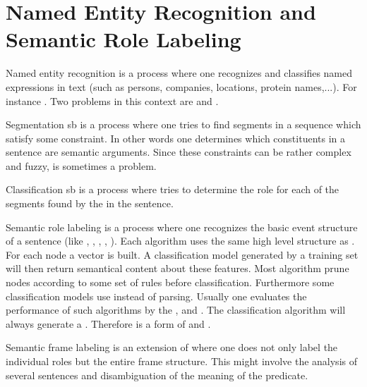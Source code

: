 \section{Named Entity Recognition and Semantic Role Labeling}
\begin{df}{Named entity recognition}
\sb{} is a process where one recognizes and classifies named expressions in text (such as persons, companies, locations, protein names,...). For instance . Two problems in this context are  and .
\end{df}
\begin{df}{Segmentation}
sb{} is a process where one tries to find segments in a sequence which satisfy some constraint. In other words one determines which constituents in a sentence are semantic arguments. Since these constraints can be rather complex and fuzzy, \sb{} is sometimes a problem.
\end{df}
\begin{df}[Recognition]{Classification}
sb{} is a process where tries to determine the role for each of the segments found by the  in the sentence.
\end{df}
\begin{df}{Semantic role labeling}
\sb{} is a process where one recognizes the basic event structure of a sentence (like , , , , ). Each algorithm uses the same high level structure as . For each node a vector is built. A classification model generated by a training set will then return semantical content about these features. Most algorithm prune nodes according to some set of rules before classification. Furthermore some classification models use  instead of parsing. Usually one evaluates the performance of such algorithms by the ,  and . The classification algorithm will always generate a . Therefore \sb{} is a form of  and .
\end{df}
\begin{df}{Semantic frame labeling}
\sb{} is an extension of  where one does not only label the individual roles but the entire frame structure. This might involve the analysis of several sentences and disambiguation of the meaning of the predicate.
\end{df}

